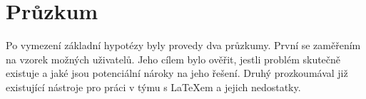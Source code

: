 \chapter{Průzkum}

Po vymezení základní hypotézy byly provedy dva průzkumy. První se zaměřením na vzorek možných uživatelů. Jeho cílem bylo ověřit, jestli problém skutečně existuje a jaké jsou potenciální nároky na jeho řešení. Druhý prozkoumával již existující nástroje pro práci v týmu s \LaTeX{em} a jejich nedostatky.






